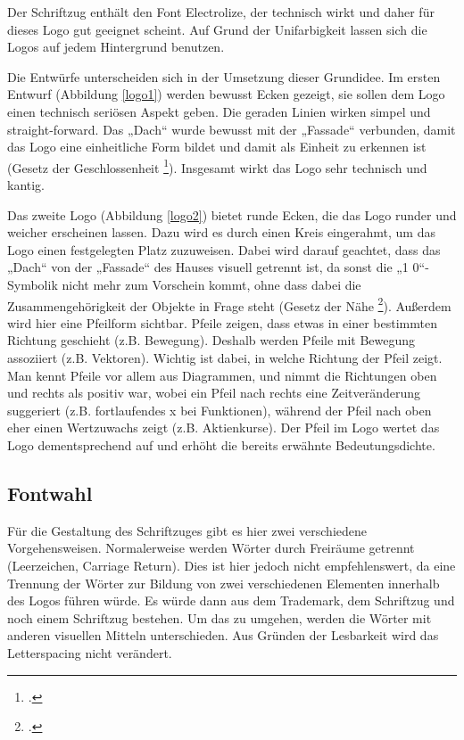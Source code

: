 Der Schriftzug enthält den Font Electrolize, der technisch wirkt und daher für dieses Logo gut geeignet scheint. Auf Grund der Unifarbigkeit lassen sich die Logos auf jedem Hintergrund benutzen.


Die Entwürfe unterscheiden sich in der Umsetzung dieser Grundidee. Im ersten Entwurf (Abbildung \ref{logo1}) werden bewusst Ecken gezeigt, sie sollen dem Logo einen technisch seriösen Aspekt geben. Die geraden Linien wirken simpel und straight-forward. Das „Dach“ wurde bewusst mit der „Fassade“ verbunden, damit das Logo eine einheitliche Form bildet und damit als Einheit zu erkennen ist (Gesetz der Geschlossenheit \footcite[vgl.][]{gestalt}). Insgesamt wirkt das Logo sehr technisch und kantig.


Das zweite Logo (Abbildung \ref{logo2}) bietet runde Ecken, die das Logo runder und weicher erscheinen lassen. Dazu wird es durch einen Kreis eingerahmt, um das Logo einen festgelegten Platz zuzuweisen. Dabei wird darauf geachtet, dass das „Dach“ von der „Fassade“ des Hauses visuell getrennt ist, da sonst die „1 0“-Symbolik nicht mehr zum Vorschein kommt, ohne dass dabei die Zusammengehörigkeit der Objekte in Frage steht (Gesetz der Nähe \footcite[vgl.][]{gestalt}). Außerdem wird hier eine Pfeilform sichtbar. Pfeile zeigen, dass etwas in einer bestimmten Richtung geschieht (z.B. Bewegung). Deshalb werden Pfeile mit Bewegung assoziiert (z.B. Vektoren). Wichtig ist dabei, in welche Richtung der Pfeil zeigt. Man kennt Pfeile vor allem aus Diagrammen, und nimmt die Richtungen oben und rechts als positiv war, wobei ein Pfeil nach rechts eine Zeitveränderung suggeriert (z.B. fortlaufendes x bei Funktionen), während der Pfeil nach oben eher einen Wertzuwachs zeigt (z.B. Aktienkurse). Der Pfeil im Logo wertet das Logo dementsprechend auf und erhöht die bereits erwähnte Bedeutungsdichte.

\subsection{Fontwahl}
Für die Gestaltung des Schriftzuges gibt es hier zwei verschiedene Vorgehensweisen. Normalerweise werden Wörter durch Freiräume getrennt (Leerzeichen, Carriage Return). Dies ist hier jedoch nicht empfehlenswert, da eine Trennung der Wörter zur Bildung von zwei verschiedenen Elementen innerhalb des Logos führen würde. Es würde dann aus dem Trademark, dem Schriftzug und noch einem Schriftzug bestehen. Um das zu umgehen, werden die Wörter mit anderen visuellen Mitteln unterschieden. Aus Gründen der Lesbarkeit wird das Letterspacing nicht verändert.

